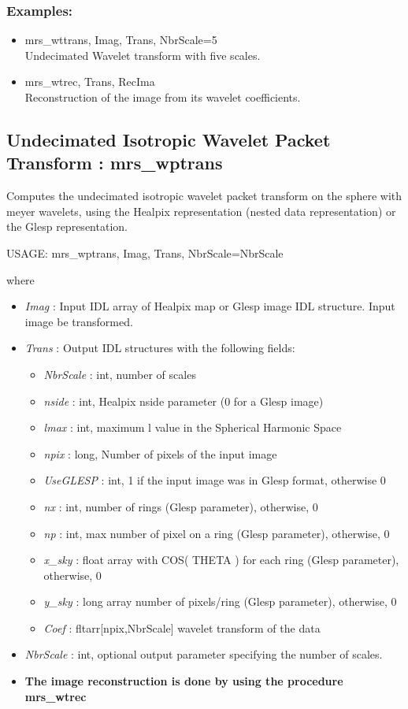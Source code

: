 \subsubsection*{Examples:} 
\begin{itemize}
\item mrs\_wttrans, Imag, Trans, NbrScale=5 \\
Undecimated Wavelet transform with five scales.
\item mrs\_wtrec, Trans, RecIma \\
Reconstruction of the image from its wavelet coefficients.
\end{itemize}



\subsection{Undecimated Isotropic Wavelet Packet Transform : mrs\_wptrans}
Computes the undecimated isotropic wavelet packet transform on the sphere with meyer wavelets, 
using the Healpix representation (nested data representation) or the Glesp representation.
{\bf
\begin{center}
     USAGE: mrs\_wptrans, Imag, Trans, NbrScale=NbrScale
\end{center}}
where
\begin{itemize}
\item {\em Imag} : Input IDL array of Healpix map or Glesp image IDL structure. Input image be transformed. 
\item {\em Trans} : Output IDL structures with the following fields:
\begin{itemize}
\item {\em NbrScale} : int, number of scales
\item {\em nside} : int, Healpix nside parameter (0 for a Glesp image)
\item {\em lmax} : int, maximum l value in the Spherical Harmonic Space
\item {\em npix} : long, Number of pixels of the input image
\item {\em UseGLESP} : int, 1 if the input image was in Glesp format, otherwise 0
\item {\em nx} : int, number of rings (Glesp parameter), otherwise, 0
\item {\em np} : int, max number of pixel on a ring (Glesp parameter), otherwise, 0
\item {\em x\_sky} : float array with COS( THETA ) for each ring (Glesp parameter), otherwise, 0
\item {\em y\_sky} : long array number of pixels/ring (Glesp parameter), otherwise, 0
\item {\em Coef} : fltarr[npix,NbrScale] wavelet transform of the data
\end{itemize}
\item {\em NbrScale} : int, optional output parameter specifying the number of scales.
\item {\bf The image reconstruction is done by using the procedure mrs\_wtrec}
\end{itemize}

